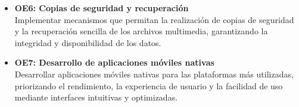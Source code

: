 \begin{itemize}
    \item \textbf{OE6: Copias de seguridad y recuperación} \\
    Implementar mecanismos que permitan la realización de copias de seguridad y la recuperación sencilla de los archivos multimedia, garantizando la integridad y disponibilidad de los datos.

    \item \textbf{OE7: Desarrollo de aplicaciones móviles nativas} \\
    Desarrollar aplicaciones móviles nativas para las plataformas más utilizadas, priorizando el rendimiento, la experiencia de usuario y la facilidad de uso mediante interfaces intuitivas y optimizadas.
\end{itemize}
